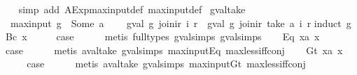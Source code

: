 \begin{isabellebody}
%
\isadelimproof
\ \ %
\endisadelimproof
%
\isatagproof
{}\isamarkupfalse%
\ {\isacharparenleft}simp\ add{\isacharcolon}\ AExp{\isachardot}max{\isacharunderscore}input{\isacharunderscore}def\ max{\isacharunderscore}input{\isacharunderscore}def{\isacharparenright}%
\endisatagproof
{\isafoldproof}%
%
\isadelimproof
\isanewline
%
\endisadelimproof
\isanewline
{}\isamarkupfalse%
\ gval{\isacharunderscore}take{\isacharcolon}\isanewline
\ \ {\isachardoublequoteopen}max{\isacharunderscore}input\ g\ {\isacharless}\ Some\ a\ {\isasymLongrightarrow}\isanewline
\ \ \ gval\ g\ {\isacharparenleft}join{\isacharunderscore}ir\ i\ r{\isacharparenright}\ {\isacharequal}\ gval\ g\ {\isacharparenleft}join{\isacharunderscore}ir\ {\isacharparenleft}take\ a\ i{\isacharparenright}\ r{\isacharparenright}{\isachardoublequoteclose}\isanewline
%
\isadelimproof
%
\endisadelimproof
%
\isatagproof
{}\isamarkupfalse%
{\isacharparenleft}induct\ g{\isacharparenright}\isanewline
{}\isamarkupfalse%
\ {\isacharparenleft}Bc\ x{\isacharparenright}\isanewline
\ \ \isamarkupfalse%
\ \isamarkupfalse%
\ {\isacharquery}case\isanewline
\ \ \ \ \isamarkupfalse%
\ {\isacharparenleft}metis\ {\isacharparenleft}full{\isacharunderscore}types{\isacharparenright}\ gval{\isachardot}simps{\isacharparenleft}{}{\isacharparenright}\ gval{\isachardot}simps{\isacharparenleft}{}{\isacharparenright}{\isacharparenright}\isanewline
{}\isamarkupfalse%
\isanewline
\ \ \isamarkupfalse%
\ {\isacharparenleft}Eq\ x{}a\ x{}{\isacharparenright}\isanewline
\ \ \isamarkupfalse%
\ \isamarkupfalse%
\ {\isacharquery}case\isanewline
\ \ \ \ \isamarkupfalse%
\ {\isacharparenleft}metis\ aval{\isacharunderscore}take\ gval{\isachardot}simps{\isacharparenleft}{}{\isacharparenright}\ max{\isacharunderscore}input{\isacharunderscore}Eq\ max{\isacharunderscore}less{\isacharunderscore}iff{\isacharunderscore}conj{\isacharparenright}\isanewline
{}\isamarkupfalse%
\isanewline
\ \ \isamarkupfalse%
\ {\isacharparenleft}Gt\ x{}a\ x{}{\isacharparenright}\isanewline
\ \ \isamarkupfalse%
\ \isamarkupfalse%
\ {\isacharquery}case\isanewline
\ \ \ \ \isamarkupfalse%
\ {\isacharparenleft}metis\ aval{\isacharunderscore}take\ gval{\isachardot}simps{\isacharparenleft}{}{\isacharparenright}\ max{\isacharunderscore}input{\isacharunderscore}Gt\ max{\isacharunderscore}less{\isacharunderscore}iff{\isacharunderscore}conj{\isacharparenright}\isanewline

\end{isabellebody}
